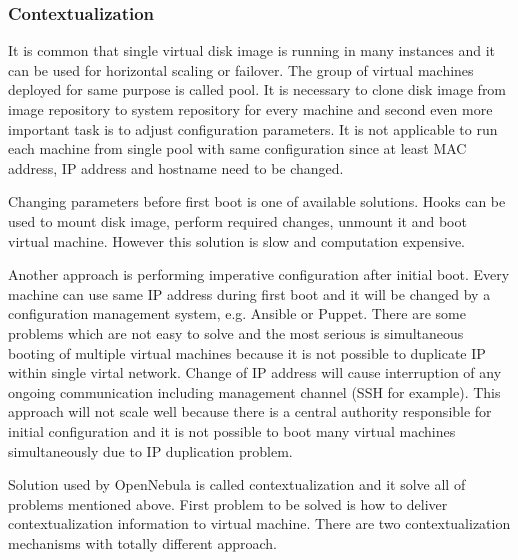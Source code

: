 \subsubsection{Contextualization}
It is common that single virtual disk image is running in many instances and it can be used for horizontal scaling or failover. The group of virtual machines deployed for same purpose is called pool. It is necessary to clone disk image from image repository to system repository for every machine and second even more important task is to adjust configuration parameters. It is not applicable to run each machine from single pool with same configuration since at least \Ac{MAC} address, \Ac{IP} address and hostname need to be changed.

Changing parameters before first boot is one of available solutions. Hooks can be used to mount disk image, perform required changes, unmount it and boot virtual machine. However this solution is slow and computation expensive.

Another approach is performing imperative configuration after initial boot. Every machine can use same \Ac{IP} address during first boot and it will be changed by a configuration management system, e.g. Ansible or Puppet. There are some problems which are not easy to solve and the most serious is simultaneous booting of multiple virtual machines because it is not possible to duplicate \Ac{IP} within single virtal network. Change of \Ac{IP} address will cause interruption of any ongoing communication including management channel (\Ac{SSH} for example). This approach will not scale well because there is a central authority responsible for initial configuration and it is not possible to boot many virtual machines simultaneously due to \Ac{IP} duplication problem.

Solution used by OpenNebula is called contextualization and it solve all of problems mentioned above. First problem to be solved is how to deliver contextualization information to virtual machine. There are two contextualization mechanisms with totally different approach.

